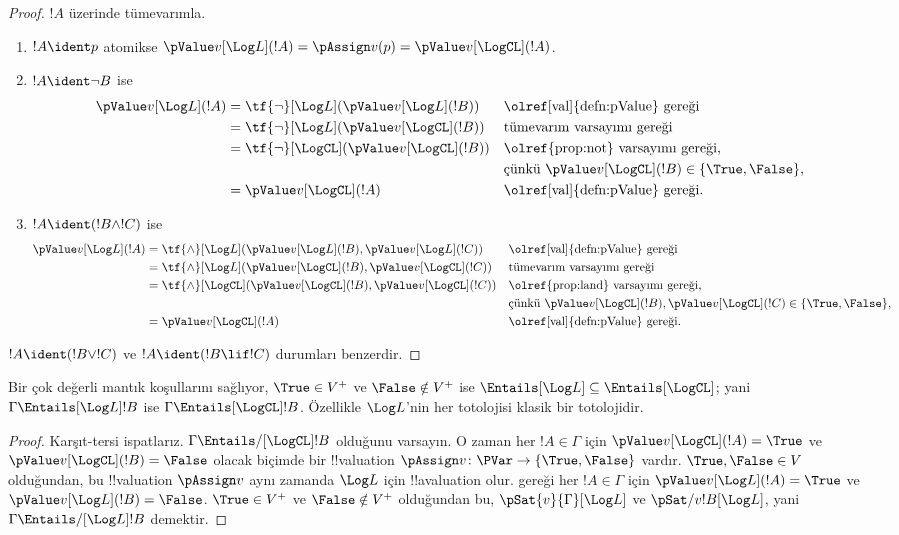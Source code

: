 \documentclass[../../../include/open-logic-section]{subfiles}
\begin{document}
\begin{proof}
  $!A$ üzerinde tümevarımla.
  \begin{enumerate}
  \item $!A\ident p$ atomikse
  $\pValue v[\Log L](!A)=\pAssign v(p)=\pValue v[\LogCL](!A)$.
  \item $!A\ident\lnot B$ ise
  \begin{align*}
    \pValue v[\Log L](!A) & = \tf{\lnot}[\Log L](\pValue v[\Log L](!B)) & &\text{\olref[val]{defn:pValue} gereği}\\
    & = \tf{\lnot}[\Log L](\pValue v[\LogCL](!B)) && \text{tümevarım varsayımı gereği}\\
    & = \tf{\lnot}[\LogCL](\pValue v[\LogCL](!B)) 
&&\text{\olref{prop:not} varsayımı gereği,}\\
&&&\text{çünkü $\pValue v[\LogCL](!B) \in \{\True, \False\}$,}\\
& = \pValue v[\LogCL](!A) &&\text{\olref[val]{defn:pValue} gereği}.
\end{align*}
\item $!A\ident(!B\land !C)$ ise
\begin{align*}
  \pValue v[\Log L](!A) & = \tf{\land}[\Log L](\pValue v[\Log L](!B), \pValue v[\Log L](!C)) & &\text{\olref[val]{defn:pValue} gereği}\\
  & = \tf{\land}[\Log L](\pValue v[\LogCL](!B),\pValue v[\LogCL](!C)) && \text{tümevarım varsayımı gereği}\\
  & = \tf{\land}[\LogCL](\pValue v[\LogCL](!B),\pValue v[\LogCL](!C)) 
&&\text{\olref{prop:land} varsayımı gereği,}\\
&&&\text{çünkü $\pValue v[\LogCL](!B),\pValue v[\LogCL](!C) \in \{\True, \False\}$,}\\
& = \pValue v[\LogCL](!A) &&\text{\olref[val]{defn:pValue} gereği}.
\end{align*}
\end{enumerate}
$!A\ident(!B\lor !C)$ ve $!A\ident(!B\lif !C)$ durumları benzerdir.
\end{proof}

\begin{cor}
  Bir çok değerli mantık  koşullarını sağlıyor,
  $\True\in V^+$ ve $\False\notin V^+$ ise
  ${\Entails[\Log L]}\subseteq{\Entails[\LogCL]}$; yani
  $\Gamma\Entails[\Log L]!B$ ise $\Gamma\Entails[\LogCL]!B$. Özellikle
  $\Log L$'nin her totolojisi klasik bir totolojidir.
\end{cor}

\begin{proof}
  Karşıt-tersi ispatlarız. $\Gamma\Entails/[\LogCL]!B$ olduğunu varsayın.
  O zaman her $!A\in\Gamma$ için $\pValue v[\LogCL](!A)=\True$ ve
  $\pValue v[\LogCL](!B)=\False$ olacak biçimde bir
  !!{valuation} $\pAssign v\colon\PVar\to\{\True,\False\}$ vardır.
  $\True,\False\in V$ olduğundan, bu !!{valuation} $\pAssign v$ aynı zamanda
  $\Log L$ için !!a{valuation} olur.  gereği her
  $!A\in\Gamma$ için $\pValue v[\Log L](!A)=\True$ ve
  $\pValue v[\Log L](!B)=\False$. $\True\in V^+$ ve $\False\notin V^+$
  olduğundan bu, $\pSat{v}{\Gamma}[\Log L]$ ve
  $\pSat/{v}{!B}[\Log L]$, yani
  $\Gamma\Entails/[\Log L]!B$ demektir.
\end{proof}
\end{document}
